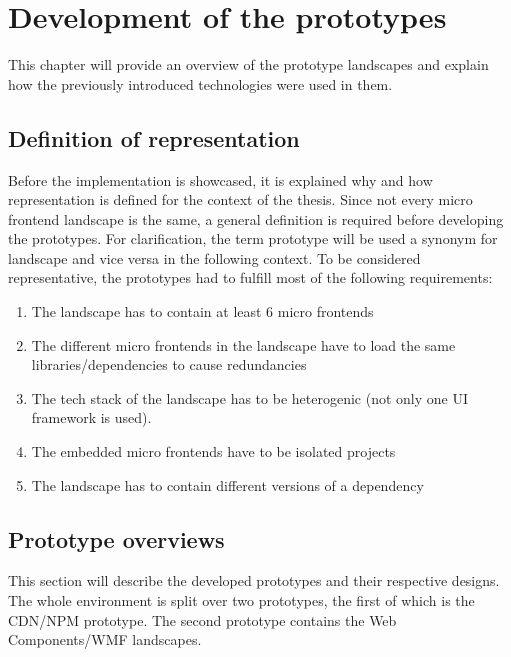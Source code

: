 \chapter{Development of the prototypes} %
\label{Chapter6}


This chapter will provide an overview of the prototype landscapes and explain how the previously introduced technologies were used in them.

\section{Definition of representation}

Before the implementation is showcased, it is explained why and how representation is defined for the context of the thesis.
Since not every micro frontend landscape is the same, a general definition is required before developing the prototypes.
For clarification, the term prototype will be used a synonym for landscape and vice versa in the following context.
To be considered representative, the prototypes had to fulfill most of the following requirements:

\begin{enumerate}
	\item The landscape has to contain at least 6 micro frontends
	\item The different micro frontends in the landscape have to load the same libraries/dependencies to cause redundancies
	\item The tech stack of the landscape has to be heterogenic (not only one UI framework is used).
	\item The embedded micro frontends have to be isolated projects
	\item The landscape has to contain different versions of a dependency
\end{enumerate}

\section{Prototype overviews}

This section will describe the developed prototypes and their respective designs. The whole environment is split over two prototypes, the first of which is the CDN/NPM prototype.
The second prototype contains the Web Components/WMF landscapes.

